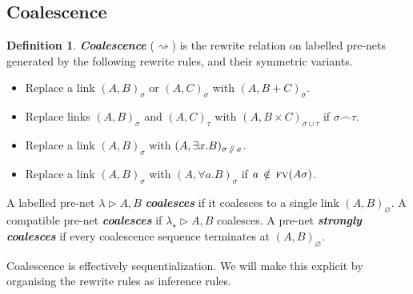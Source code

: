 \documentclass{article}
\theoremstyle{definition}
\newtheorem{definition}{Definition}
\theoremstyle{plain}
\newcommand\defn[1]{\textit{\textbf{#1}}}
\newcommand\+{+}
\renewcommand\*{\times}
\newcommand\fv{\textsc{fv}}
\newcommand\net[3]{#1\triangleright #2,#3}
\newcommand\comp\frown
\newcommand\clink[3][\sigma]{(#2,#3)_{#1}}
\newcommand\minus{\mathop{/\mathchoice{\kern-3pt}{\kern-3pt}{\kern-2.5pt}{\kern-2pt}/}}
\newcommand\coals{\rightsquigarrow}
\begin{document}

\subsection{Coalescence}


\begin{definition}
\defn{Coalescence} ($\coals$) is the rewrite relation on labelled pre-nets generated by the following rewrite rules, and their symmetric variants.
%
%
\begin{itemize}
	\item 
\makebox[40pt][l]{$B\+C$:} 
Replace a link $\clink AB$ or $\clink AC$ with $\clink A{B\+C}$.
	\item 
\makebox[40pt][l]{$B\*C$:} 
Replace links $\clink AB$ and $\clink[\tau]AC$ with $\clink[\sigma\cup\tau]A{B\*C} $ if $\sigma\comp\tau$.
	\item
{} 
Replace a link $\clink AB$ with $\clink[\sigma\minus x]A{\exists x.B}$.
	\item
{}
Replace a link $\clink AB$ with $\clink A{\forall a.B}$ if $a\,\notin\,\fv(A\sigma)$.
\end{itemize}
%
%
%
A labelled pre-net $\net\lambda AB$ \defn{coalesces} if it coalesces to a single link $\clink[\varnothing]AB$. A compatible pre-net \defn{coalesces} if $\net{\lambda_\star}AB$ coalesces. A pre-net \defn{strongly coalesces} if every coalescence sequence terminates at $\clink[\varnothing]AB$.
\end{definition}

Coalescence is effectively sequentialization. We will make this explicit by organising the rewrite rules as inference rules. 
\end{document}
